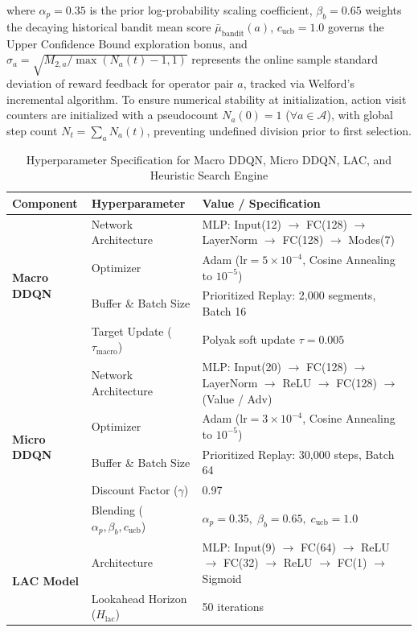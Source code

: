 where $\alpha_p = 0.35$ is the prior log-probability scaling coefficient, $\beta_b = 0.65$ weights the decaying historical bandit mean score $\bar{\mu}_{\text{bandit}}(a)$, $c_{\text{ucb}} = 1.0$ governs the Upper Confidence Bound exploration bonus, and $\sigma_a = \sqrt{M_{2, a}/\max(N_a(t) - 1, 1)}$ represents the online sample standard deviation of reward feedback for operator pair $a$, tracked via Welford's incremental algorithm. To ensure numerical stability at initialization, action visit counters are initialized with a pseudocount $N_a(0) = 1$ ($\forall a \in \mathcal{A}$), with global step count $N_t = \sum_{a} N_a(t)$, preventing undefined division prior to first selection.

\begin{table}[!t]
\caption{Hyperparameter Specification for Macro DDQN, Micro DDQN, LAC, and Heuristic Search Engine}
\label{tab:hyperparameters}
\centering
\footnotesize
\begin{tabularx}{\columnwidth}{l l X}
\toprule
\textbf{Component} & \textbf{Hyperparameter} & \textbf{Value / Specification} \\
\midrule
\multirow{4}{*}{\textbf{Macro DDQN}} 
  & Network Architecture & MLP: Input(12) $\to$ FC(128) $\to$ LayerNorm $\to$ FC(128) $\to$ Modes(7) \\
  & Optimizer & Adam ($\text{lr} = 5 \times 10^{-4}$, Cosine Annealing to $10^{-5}$) \\
  & Buffer \& Batch Size & Prioritized Replay: 2,000 segments, Batch 16 \\
  & Target Update ($\tau_{\text{macro}}$) & Polyak soft update $\tau = 0.005$ \\
\midrule
\multirow{5}{*}{\textbf{Micro DDQN}} 
  & Network Architecture & MLP: Input(20) $\to$ FC(128) $\to$ LayerNorm $\to$ ReLU $\to$ FC(128) $\to$ (Value / Adv) \\
  & Optimizer & Adam ($\text{lr} = 3 \times 10^{-4}$, Cosine Annealing to $10^{-5}$) \\
  & Buffer \& Batch Size & Prioritized Replay: 30,000 steps, Batch 64 \\
  & Discount Factor ($\gamma$) & 0.97 \\
  & Blending ($\alpha_p, \beta_b, c_{\text{ucb}}$) & $\alpha_p = 0.35, \; \beta_b = 0.65, \; c_{\text{ucb}} = 1.0$ \\
\midrule
\multirow{4}{*}{\textbf{LAC Model}} 
  & Architecture & MLP: Input(9) $\to$ FC(64) $\to$ ReLU $\to$ FC(32) $\to$ ReLU $\to$ FC(1) $\to$ Sigmoid \\
  & Lookahead Horizon ($H_{\text{lac}}$) & 50 iterations \\

\end{tabularx}
\end{table}

